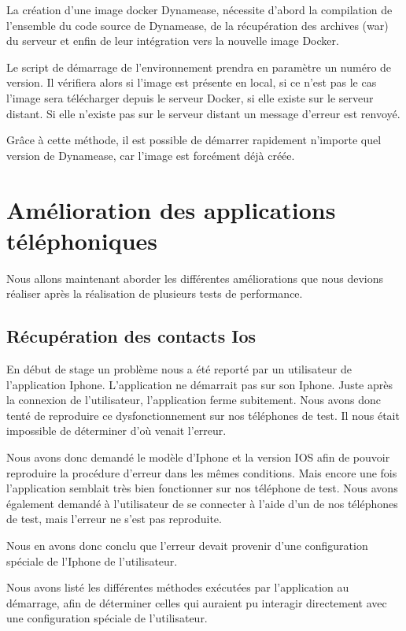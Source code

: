La création d'une image docker Dynamease, nécessite d'abord la compilation de l'ensemble du code source de Dynamease, de la récupération des archives (war) du serveur et enfin de leur intégration vers la nouvelle image Docker.

Le script de démarrage de l'environnement prendra en paramètre un numéro de version. Il vérifiera alors si l'image est présente en local, si ce n'est pas le cas l'image sera télécharger depuis le serveur Docker, si elle existe sur le serveur distant. Si elle n'existe pas sur le serveur distant un message d'erreur est renvoyé.

Grâce à cette méthode, il est possible de démarrer rapidement n'importe quel version de Dynamease, car l'image est forcément déjà créée.

\section{Amélioration des applications téléphoniques}

Nous allons maintenant aborder les différentes améliorations que nous devions réaliser après la réalisation de plusieurs tests de performance.

\subsection{Récupération des contacts Ios}

En début de stage un problème nous a été reporté par un utilisateur de l'application Iphone. L'application ne démarrait pas sur son Iphone. Juste après la connexion de l'utilisateur, l'application ferme subitement. Nous avons donc tenté de reproduire ce dysfonctionnement sur nos téléphones de test. Il nous était impossible de déterminer d'où venait l'erreur.

Nous avons donc demandé le modèle d'Iphone et la version IOS afin de pouvoir reproduire la procédure d'erreur dans les mêmes conditions. Mais encore une fois l'application semblait très bien fonctionner sur nos téléphone de test. Nous avons également demandé à l'utilisateur de se connecter à l'aide d'un de nos téléphones de test, mais l'erreur ne s'est pas reproduite.

Nous en avons donc conclu que l'erreur devait provenir d'une configuration spéciale de l'Iphone de l'utilisateur.

Nous avons listé les différentes méthodes exécutées par l'application au démarrage, afin de déterminer celles qui auraient pu interagir directement avec une configuration spéciale de l'utilisateur.

